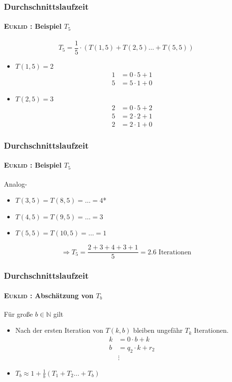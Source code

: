 \documentclass[•]{beamer}
\begin{document}
\begin{frame}	
		\frametitle{Durchschnittslaufzeit}
	\framesubtitle{\textsc{Euklid} : Beispiel $T_5$}
	\pause
$$T_5 = \frac{1}{5}\cdot (T(1,5) + T(2,5) \dots +T(5,5))$$	
\pause
	\begin{itemize}
	\item $T(1,5) = 2$
	\setcounter{equation}{0}
	\begin{align}
	1&=0\cdot 5 + 1	\\
	5&=5\cdot 1 + 0
	\end{align}
	\pause
	\setcounter{equation}{0}
	\item $T(2,5) = 3$
	\begin{align}
	2&=0\cdot 5 + 2	\\
	5&=2\cdot 2 + 1 \\
	2&= 2\cdot 1+0
	\end{align}
	\end{itemize}
	
	\end{frame}
	

\begin{frame}	
		\frametitle{Durchschnittslaufzeit}
	\framesubtitle{\textsc{Euklid} : Beispiel $T_5$}
	Analog-
	\begin{itemize}
	\item $T(3,5) = T(8,5) = \dots = 4$*
	\item $T(4,5) = T(9,5) = \dots = 3$
	\item $T(5,5) = T(10,5) = \dots = 1$
	\pause
	\end{itemize}
	\vspace{20pt}
	 $$\Rightarrow T_5 = \frac{2+3+4+3+1}{5} = 2.6\text{ Iterationen}$$
	\end{frame}	

	\begin{frame}	
		\frametitle{Durchschnittslaufzeit}
	\framesubtitle{\textsc{Euklid} : Absch\"atzung von $T_b$}
	\pause
	F\"ur gro{\ss}e $b \in \mathbb{N}$ gilt
	\begin{itemize}
	\item Nach der ersten Iteration von $T(k,b)$ bleiben ungef\"ahr $T_{k}$ Iterationen.
	\pause
	\begin{align*}
	k&=0\cdot b + k\\
	b&=q_{2}\cdot k + r_2\\
	&\vdots
\end{align*}		
\pause
	\item $T_b \approx 1 + \frac{1}{b} (T_1 + T_2 \dots + T_{b})$
	\end{itemize}
\end{frame}		
\end{document}
